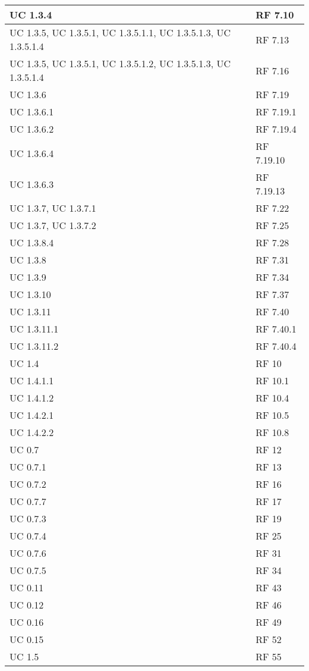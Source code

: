{\begin{longtable} [c]{| p{4cm} | p{4cm} |}
 \hline 
UC 1.3.4 & RF 7.10\\ 
 \hline 
UC 1.3.5, UC 1.3.5.1, UC 1.3.5.1.1, UC 1.3.5.1.3, UC 1.3.5.1.4 & RF 7.13\\ 
 \hline 
UC 1.3.5, UC 1.3.5.1, UC 1.3.5.1.2, UC 1.3.5.1.3, UC 1.3.5.1.4 & RF 7.16\\ 
 \hline 
UC 1.3.6 & RF 7.19\\ 
 \hline 
UC 1.3.6.1 & RF 7.19.1\\ 
 \hline 
UC 1.3.6.2 & RF 7.19.4\\ 
 \hline 
UC 1.3.6.4 & RF 7.19.10\\ 
 \hline 
UC 1.3.6.3 & RF 7.19.13\\ 
 \hline 
UC 1.3.7, UC 1.3.7.1 & RF 7.22\\ 
 \hline 
UC 1.3.7, UC 1.3.7.2 & RF 7.25\\ 
 \hline 
UC 1.3.8.4 & RF 7.28\\ 
 \hline 
UC 1.3.8 & RF 7.31\\ 
 \hline 
UC 1.3.9 & RF 7.34\\ 
 \hline 
UC 1.3.10 & RF 7.37\\ 
 \hline 
UC 1.3.11 & RF 7.40\\ 
 \hline 
UC 1.3.11.1 & RF 7.40.1\\ 
 \hline 
UC 1.3.11.2 & RF 7.40.4\\ 
 \hline 
UC 1.4 & RF 10\\ 
 \hline 
UC 1.4.1.1 & RF 10.1\\ 
 \hline 
UC 1.4.1.2 & RF 10.4\\ 
 \hline 
UC 1.4.2.1 & RF 10.5\\ 
 \hline 
UC 1.4.2.2 & RF 10.8\\ 
 \hline 
UC 0.7 & RF 12\\ 
 \hline 
UC 0.7.1 & RF 13\\ 
 \hline 
UC 0.7.2 & RF 16\\ 
 \hline 
UC 0.7.7 & RF 17\\ 
 \hline 
UC 0.7.3 & RF 19\\ 
 \hline 
UC 0.7.4 & RF 25\\ 
 \hline 
UC 0.7.6 & RF 31\\ 
 \hline 
UC 0.7.5 & RF 34\\ 
 \hline 
UC 0.11 & RF 43\\ 
 \hline 
UC 0.12 & RF 46\\ 
 \hline 
UC 0.16 & RF 49\\ 
 \hline 
UC 0.15 & RF 52\\ 
 \hline 
UC 1.5 & RF 55\\ 

\end{longtable}}
